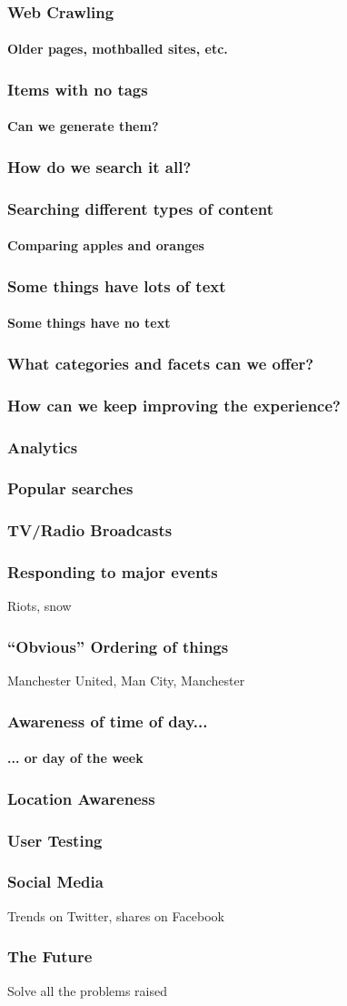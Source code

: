 \documentclass{beamer}
\begin{document}
\begin{frame}
  \frametitle{Web Crawling}
  \framesubtitle{Older pages, mothballed sites, etc.}
\end{frame}

\begin{frame}
  \frametitle{Items with no tags}
  \framesubtitle{Can we generate them?}
\end{frame}

\begin{frame}
  \frametitle{How do we search it all?}
\end{frame}

\begin{frame}
  \frametitle{Searching different types of content}
  \framesubtitle{Comparing apples and oranges}
\end{frame}

\begin{frame}
  \frametitle{Some things have lots of text}
  \framesubtitle{Some things have no text}
\end{frame}

\begin{frame}
  \frametitle{What categories and facets can we offer?}
\end{frame}

\begin{frame}
  \frametitle{How can we keep improving the experience?}
\end{frame}

\begin{frame}
  \frametitle{Analytics}
\end{frame}

\begin{frame}
  \frametitle{Popular searches}
\end{frame}

\begin{frame}
  \frametitle{TV/Radio Broadcasts}
\end{frame}

\begin{frame}
  \frametitle{Responding to major events}
  Riots, snow
\end{frame}

\begin{frame}
  \frametitle{``Obvious'' Ordering of things}
  Manchester United, Man City, Manchester
\end{frame}

\begin{frame}
  \frametitle{Awareness of time of day...}
  \framesubtitle{... or day of the week}
\end{frame}

\begin{frame}
  \frametitle{Location Awareness}
\end{frame}

\begin{frame}
  \frametitle{User Testing}
\end{frame}

\begin{frame}
  \frametitle{Social Media}
  Trends on Twitter, shares on Facebook
\end{frame}

\begin{frame}
  \frametitle{The Future}
  Solve all the problems raised
\end{frame}
\end{document}

